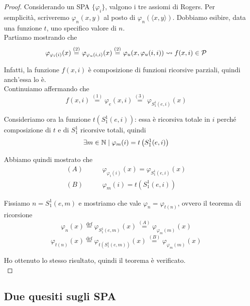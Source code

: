 \begin{proof}
	Considerando un SPA $\{\varphi_i\}$, valgono i tre assiomi di Rogers. Per semplicità, scriveremo $\varphi_n (x,y)$ al posto di $\varphi_n (\langle x,y \rangle)$. Dobbiamo esibire, data una funzione $t$, uno specifico valore di $n$.\\
	
	Partiamo mostrando che
	$$ \varphi_{\varphi_i (i)} (x) \stackrel{(2)}{=} \varphi_{\varphi_u (i,i)} (x) \stackrel{(2)}{=} \varphi_u (x, \varphi_u (i,i)) \rightsquigarrow f(x,i) \in \mathcal{P} $$
	
	Infatti, la funzione $f(x,i)$ è composizione di funzioni ricorsive parziali, quindi anch'essa lo è.\\
	
	Continuiamo affermando che
	$$ f(x,i) \stackrel{(1)}{=} \varphi_e (x,i) \stackrel{(3)}{=} \varphi_{S_1^1 (e,i)} (x) $$
	
	Consideriamo ora la funzione $t\left(S_1^1 (e,i)\right)$: essa è ricorsiva totale in $i$ perché composizione di $t$ e di $S_1^1$ ricorsive totali, quindi
	$$ \exists m \in \mathbb{N} \mid \varphi_m (i) = t\left(S_1^1 (e,i)\right) $$
	
	Abbiamo quindi mostrato che
	\begin{align*}
		(A) \quad \quad & \varphi_{\varphi_i (i)} (x) = \varphi_{S_1^1 (e,i)} (x) \\
		(B) \quad \quad & \varphi_m (i) = t\left(S_1^1 (e,i) \right)
	\end{align*}
	
	Fissiamo $n = S_1^1 (e,m)$ e mostriamo che vale $\varphi_n = \varphi_{t(n)}$, ovvero il teorema di ricorsione
	$$ \varphi_n (x) \stackrel{\text{def}}{=} \varphi_{S_1^1 (e,m)} (x) \stackrel{(A)}{=} \varphi_{\varphi_m (m)} (x) $$
	$$ \varphi_{t(n)} (x) \stackrel{\text{def}}{=} \varphi_{t\left(S_1^1 (e,m)\right)} (x) \stackrel{(B)}{=} \varphi_{\varphi_m (m)} (x)$$
	
	Ho ottenuto lo stesso risultato, quindi il teorema è verificato.\\
\end{proof}

\subsection{Due quesiti sugli SPA}

